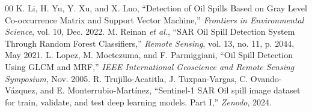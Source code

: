 \documentclass[conference]{IEEEtran}
\begin{document}
\begin{thebibliography}{00}
 K. Li, H. Yu, Y. Xu, and X. Luo, ``Detection of Oil Spills Based on Gray Level Co-occurrence Matrix and Support Vector Machine,'' \emph{Frontiers in Environmental Science}, vol. 10, Dec. 2022.
 M. Reinan \emph{et al.}, ``SAR Oil Spill Detection System Through Random Forest Classifiers,'' \emph{Remote Sensing}, vol. 13, no. 11, p. 2044, May 2021.
 L. Lopez, M. Moctezuma, and F. Parmiggiani, ``Oil Spill Detection Using GLCM and MRF,'' \emph{IEEE International Geoscience and Remote Sensing Symposium}, Nov. 2005.
 R. Trujillo-Acatitla, J. Tuxpan-Vargas, C. Ovando-Vázquez, and E. Monterrubio-Martínez, ``Sentinel-1 SAR Oil spill image dataset for train, validate, and test deep learning models. Part I,'' \emph{Zenodo}, 2024.
\end{thebibliography}
\end{document}
